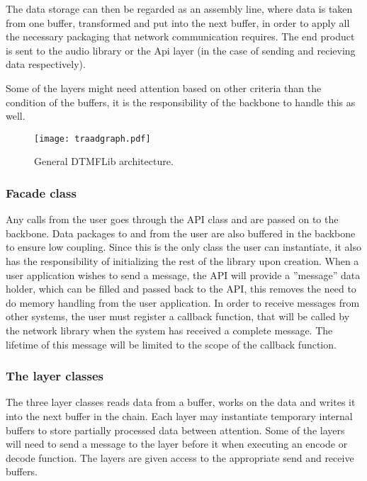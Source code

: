 The data storage can then be regarded as an assembly line, where data is taken from one buffer, transformed and put into the next buffer, in order to apply all the necessary packaging that network communication requires. The end product  is sent to the audio library or the Api layer (in the case of sending and recieving data respectively).

Some of the layers might need attention based on other criteria than the condition of the buffers, it is the responsibility of the backbone to handle this as well.

\begin{figure}[htb]
	\begin{center}
	\texttt{[image: traadgraph.pdf]}
	\caption{General DTMFLib architecture.}
	\label{fig:general_architecture}	
	\end{center}
\end{figure}

\subsubsection{Facade class}
Any calls from the user goes through the API class and are passed on to the backbone. Data packages to and from the user are also buffered in the backbone to ensure low coupling. Since this is the only class the user can instantiate, it also has the responsibility of initializing the rest of the library upon creation.
When a user application wishes to send a message, the API will provide a ''message'' data holder, which can be filled and passed back to the API, this removes the need to do memory handling from the user application.
In order to receive messages from other systems, the user must register a callback function, that will be called by the network library when the system has received a complete message. The lifetime of this message will be limited to the scope of the callback function.

\subsubsection{The layer classes}
The three layer classes reads data from a buffer, works on the data and writes it into the next buffer in the chain. Each layer may instantiate temporary internal buffers to store partially processed data between attention. Some of the layers will need to send a message to the layer before it when executing an encode or decode function. The layers are given access to the appropriate send and receive buffers.


